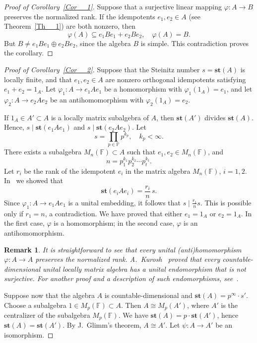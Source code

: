\documentclass[12pt]{amsart}
\newtheorem{remark}{Remark}
\begin{document}
{		
		\begin{proof}[Proof of Corollary~\ref{Cor__1}] 	Suppose that a surjective linear mapping $\varphi \colon A \to B$ preserves the normalized rank.
		If the idempotents $e_1, e_2 \in A$ (see Theorem~\ref{Th__1}) are both nonzero, then
		\[
		\varphi(A) \subseteq e_1 B e_1 + e_2 B e_2, \quad \varphi(A) = B.
		\]
		But $B \not= e_1 B e_1 \oplus e_2 B e_2$, since the algebra $B$ is simple.
		This contradiction proves the corollary. \end{proof}
		
		\begin{proof}[Proof of Corollary~\ref{Cor__2}]  	Suppose that the Steinitz number $s = \mathbf{st}(A)$ is locally finite, and that $e_1, e_2 \in A$ are nonzero orthogonal idempotents satisfying $e_1 + e_2 = 1_A$.
			Let $\varphi_1 \colon A \to e_1 A e_1$ be a homomorphism with $\varphi_1(1_A) = e_1$, and let $\varphi_2 \colon A \to e_2 A e_2$ be an antihomomorphism with $\varphi_2(1_A) = e_2$.
		
		
			If $1_{A} \in A' \subset A$ is a locally matrix subalgebra of $A$, then $\mathbf{st}(A')$ divides $\mathbf{st}(A)$. 	Hence,	$s \mid \mathbf{st}(e_1 A e_1)$ and $ s \mid \mathbf{st}(e_2 A e_2).$		Let 
		\[
		s = \prod_{p \in \mathbb{P}} p^{k_p}, \quad k_p < \infty.
		\]
		There exists a subalgebra $M_n(\mathbb{F}) \subset A$ such that 
		$e_1, e_2 \in M_n(\mathbb{F})$, and
		\[
		n = p_1^{k_1} p_2^{k_2} \cdots p_t^{k_t}.
		\]
		Let $r_i$ be the rank of the idempotent $e_i$ in the matrix algebra $M_n(\mathbb{F})$, $i = 1, 2$.  
		In~\cite{Bezushchak_Oliynyk_1} we showed that 
		\[
		\mathbf{st}(e_i A e_i) = \frac{r_i}{n}\, s.
		\]
		Since $\varphi_1 \colon A \to e_1 A e_1$ is a unital embedding, 
		it follows that $s \mid \tfrac{r_1}{n} s$.  
		This is possible only if $r_1 = n$, a contradiction.  
		We have proved that either $e_1 = 1_A$ or $e_2 = 1_A$.  
		In the first case, $\varphi$ is a homomorphism;  
		in the second case, $\varphi$ is an antihomomorphism. 
		
		\begin{remark}
	It is straightforward to see that  every unital (anti)homomorphism 
		$\varphi \colon A \to A$ preserves the normalized rank.  
		A.~Kurosh~\cite{Kurosh} proved that every countable-dimensional unital locally matrix algebra 
		has a unital endomorphism that is not surjective.  
		For another proof and a description of such endomorphisms, see~\cite{14}. 	\end{remark}
		
	
		Suppose now that the algebra $A$ is countable-dimensional and $\mathbf{st}(A) = p^{\infty} \cdot s'$.  
		Choose a subalgebra $1 \in M_p(\mathbb{F}) \subset A$.  
		Then $A \cong M_p(A')$, where $A'$ is the centralizer of the subalgebra $M_p(\mathbb{F})$.
		We have $\mathbf{st}(A) = p \cdot \mathbf{st}(A')$, hence $\mathbf{st}(A)  = \mathbf{st}(A') $. By J.~Glimm’s theorem, $A \cong A'$.  	Let $\psi \colon A \to A'$ be an isomorphism.	
		

\end{proof}}
\end{document}
